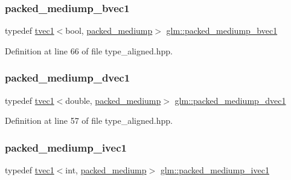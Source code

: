 \subsubsection{\texorpdfstring{packed\_mediump\_bvec1}{packed\_mediump\_bvec1}}
{\footnotesize\ttfamily typedef \mbox{\hyperlink{structglm_1_1tvec1}{tvec1}}$<$bool, \mbox{\hyperlink{namespaceglm_a0f04f086094c747d227af4425893f545a9604654c3b137cd7898689fd34b25bc0}{packed\+\_\+mediump}}$>$ \mbox{\hyperlink{group__gtc__type__aligned_ga556942046cd364d388d949bddd4c8111}{glm\+::packed\+\_\+mediump\+\_\+bvec1}}}



Definition at line 66 of file type\+\_\+aligned.\+hpp.

\mbox{\label{group__gtc__type__aligned_ga225f491d0c00d40832957ed3fd431315}} 
\subsubsection{\texorpdfstring{packed\_mediump\_dvec1}{packed\_mediump\_dvec1}}
{\footnotesize\ttfamily typedef \mbox{\hyperlink{structglm_1_1tvec1}{tvec1}}$<$double, \mbox{\hyperlink{namespaceglm_a0f04f086094c747d227af4425893f545a9604654c3b137cd7898689fd34b25bc0}{packed\+\_\+mediump}}$>$ \mbox{\hyperlink{group__gtc__type__aligned_ga225f491d0c00d40832957ed3fd431315}{glm\+::packed\+\_\+mediump\+\_\+dvec1}}}



Definition at line 57 of file type\+\_\+aligned.\+hpp.

\mbox{\label{group__gtc__type__aligned_ga0e4bfeba8aa6b0fd84abfca9d2dcc076}} 
\subsubsection{\texorpdfstring{packed\_mediump\_ivec1}{packed\_mediump\_ivec1}}
{\footnotesize\ttfamily typedef \mbox{\hyperlink{structglm_1_1tvec1}{tvec1}}$<$int, \mbox{\hyperlink{namespaceglm_a0f04f086094c747d227af4425893f545a9604654c3b137cd7898689fd34b25bc0}{packed\+\_\+mediump}}$>$ \mbox{\hyperlink{group__gtc__type__aligned_ga0e4bfeba8aa6b0fd84abfca9d2dcc076}{glm\+::packed\+\_\+mediump\+\_\+ivec1}}}



